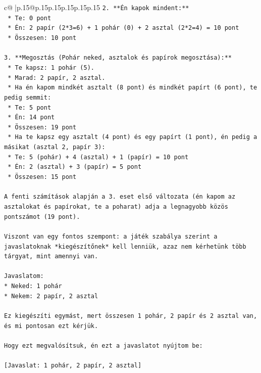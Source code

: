 \documentclass{article}
\begin{document}
{\begin{supertabular}{c@{$\;$}|p{.15\linewidth}@{}p{.15\linewidth}p{.15\linewidth}p{.15\linewidth}p{.15\linewidth}p{.15\linewidth}}
{{{\texttt{2.  **Én kapok mindent:**} \\
\texttt{    *   Te: 0 pont} \\
\texttt{    *   Én: 2 papír (2*3=6) + 1 pohár (0) + 2 asztal (2*2=4) = 10 pont} \\
\texttt{    *   Összesen: 10 pont} \\
\\ 
\texttt{3.  **Megosztás (Pohár neked, asztalok és papírok megosztása):**} \\
\texttt{    *   Te kapsz: 1 pohár (5).} \\
\texttt{    *   Marad: 2 papír, 2 asztal.} \\
\texttt{    *   Ha én kapom mindkét asztalt (8 pont) és mindkét papírt (6 pont), te pedig semmit:} \\
\texttt{        *   Te: 5 pont} \\
\texttt{        *   Én: 14 pont} \\
\texttt{        *   Összesen: 19 pont} \\
\texttt{    *   Ha te kapsz egy asztalt (4 pont) és egy papírt (1 pont), én pedig a másikat (asztal 2, papír 3):} \\
\texttt{        *   Te: 5 (pohár) + 4 (asztal) + 1 (papír) = 10 pont} \\
\texttt{        *   Én: 2 (asztal) + 3 (papír) = 5 pont} \\
\texttt{        *   Összesen: 15 pont} \\
\\ 
\texttt{A fenti számítások alapján a 3. eset első változata (én kapom az asztalokat és papírokat, te a poharat) adja a legnagyobb közös pontszámot (19 pont).} \\
\\ 
\texttt{Viszont van egy fontos szempont: a játék szabálya szerint a javaslatoknak *kiegészítőnek* kell lenniük, azaz nem kérhetünk több tárgyat, mint amennyi van.} \\
\\ 
\texttt{Javaslatom:} \\
\texttt{*   Neked: 1 pohár} \\
\texttt{*   Nekem: 2 papír, 2 asztal} \\
\\ 
\texttt{Ez kiegészíti egymást, mert összesen 1 pohár, 2 papír és 2 asztal van, és mi pontosan ezt kérjük.} \\
\\ 
\texttt{Hogy ezt megvalósítsuk, én ezt a javaslatot nyújtom be:} \\
\\ 
\texttt{{[}Javaslat: 1 pohár, 2 papír, 2 asztal{]}} \\
            }
        }
    }
     \\ \\


\end{supertabular}}
\end{document}
